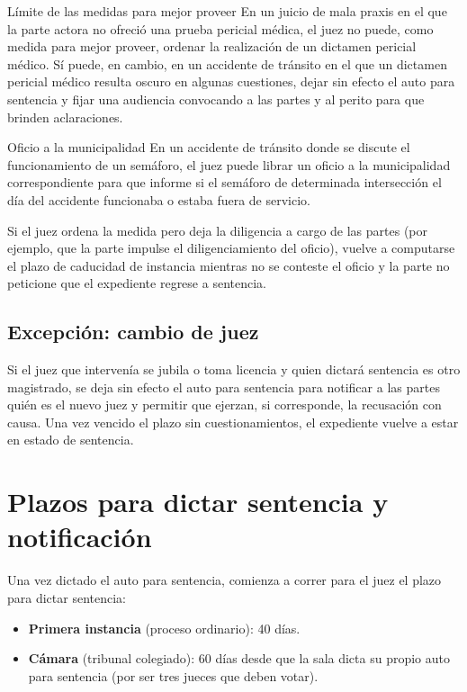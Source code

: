 \documentclass[12pt,oneside]{book}
\begin{document}
\begin{example}{Límite de las medidas para mejor proveer}
En un juicio de mala praxis en el que la parte actora no ofreció una prueba pericial médica, el juez no puede, como medida para mejor proveer, ordenar la realización de un dictamen pericial médico. Sí puede, en cambio, en un accidente de tránsito en el que un dictamen pericial médico resulta oscuro en algunas cuestiones, dejar sin efecto el auto para sentencia y fijar una audiencia convocando a las partes y al perito para que brinden aclaraciones.
\end{example}

\begin{example}{Oficio a la municipalidad}
En un accidente de tránsito donde se discute el funcionamiento de un semáforo, el juez puede librar un oficio a la municipalidad correspondiente para que informe si el semáforo de determinada intersección el día del accidente funcionaba o estaba fuera de servicio.
\end{example}

\begin{important}
Si el juez ordena la medida pero deja la diligencia a cargo de las partes (por ejemplo, que la parte impulse el diligenciamiento del oficio), vuelve a computarse el plazo de caducidad de instancia mientras no se conteste el oficio y la parte no peticione que el expediente regrese a sentencia.
\end{important}

\subsection{Excepción: cambio de juez}

Si el juez que intervenía se jubila o toma licencia y quien dictará sentencia es otro magistrado, se deja sin efecto el auto para sentencia para notificar a las partes quién es el nuevo juez y permitir que ejerzan, si corresponde, la recusación con causa. Una vez vencido el plazo sin cuestionamientos, el expediente vuelve a estar en estado de sentencia.

\section{Plazos para dictar sentencia y notificación}

Una vez dictado el auto para sentencia, comienza a correr para el juez el plazo para dictar sentencia:

\begin{itemize}
    \item \textbf{Primera instancia} (proceso ordinario): 40 días.
    \item \textbf{Cámara} (tribunal colegiado): 60 días desde que la sala dicta su propio auto para sentencia (por ser tres jueces que deben votar).
\end{itemize}
\end{document}
